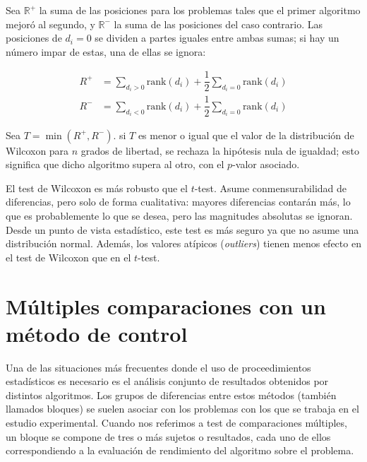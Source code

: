 Sea $\mathbb{R}^+$ la suma de las posiciones para los problemas tales que el primer algoritmo mejoró al segundo, y $\mathbb{R}^-$ la suma de las posiciones del caso contrario. 
Las posiciones de $d_i = 0$ se dividen a partes iguales entre ambas sumas; si hay un número impar de estas, una de ellas se ignora:

\begin{equation}
\begin{aligned}
R^+ & = \sum_{d_i>0} \text{rank}(d_i) + \dfrac{1}{2} \sum_{d_i=0}\text{rank}(d_i) \\
R^- & = \sum_{d_i<0} \text{rank}(d_i) + \dfrac{1}{2} \sum_{d_i=0}\text{rank}(d_i) 
\end{aligned}
\label{eq:4.34}
\end{equation}

Sea $T = \min(R^+,R^-)$. 
si $T$ es menor o igual que el valor de la distribución de Wilcoxon para $n$ grados de libertad, se rechaza la hipótesis nula de igualdad; esto significa que dicho algoritmo supera al otro, con el $p$-valor asociado. 

El test de Wilcoxon es más robusto que el $t$-test. 
Asume conmensurabilidad de diferencias, pero solo de forma cualitativa: mayores diferencias contarán más, lo que es probablemente lo que se desea, pero las magnitudes absolutas se ignoran. 
Desde un punto de vista estadístico, este test es más seguro ya que no asume una distribución normal. 
Además, los valores atípicos (\textit{outliers}) tienen menos efecto en el test de Wilcoxon que en el $t$-test. 

\section{Múltiples comparaciones con un método de control}

Una de las situaciones más frecuentes donde el uso de proceedimientos estadísticos es necesario es el análisis conjunto de resultados obtenidos por distintos algoritmos. 
Los grupos de diferencias entre estos métodos (también llamados bloques) se suelen asociar con los problemas con los que se trabaja en el estudio experimental. 
Cuando nos referimos a test de comparaciones múltiples, un bloque se compone de tres o más sujetos o resultados, cada uno de ellos correspondiendo a la evaluación de rendimiento del algoritmo sobre el problema. 

